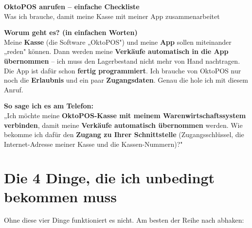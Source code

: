 \documentclass[11pt,a4paper]{article}
\newcommand{\hinweis}[1]{%
  \par\vspace{4pt}%
  \noindent\colorbox{hellgrau}{%
    \begin{minipage}{\dimexpr\linewidth-2\fboxsep}%
      \small #1%
    \end{minipage}}%
  \par\vspace{6pt}%
}
\newcommand{\sagen}[1]{%
  \par\vspace{3pt}%
  \noindent\colorbox{sagenblau}{%
    \begin{minipage}{\dimexpr\linewidth-2\fboxsep}%
      \small\textbf{\color{akzent}So sage ich es am Telefon:}\\[1pt] #1%
    \end{minipage}}%
  \par\vspace{5pt}%
}
\begin{document}
\begin{center}
  {\LARGE\bfseries\color{akzent} OktoPOS anrufen – einfache Checkliste}\\[5pt]
  {\large Was ich brauche, damit meine Kasse mit meiner App zusammenarbeitet}\\[8pt]
\end{center}

\hinweis{%
  \textbf{Worum geht es? (in einfachen Worten)}\\
  Meine \textbf{Kasse} (die Software „OktoPOS") und meine \textbf{App} sollen miteinander „reden"
  können. Dann werden meine \textbf{Verkäufe automatisch in die App übernommen} – ich muss den
  Lagerbestand nicht mehr von Hand nachtragen.\\[3pt]
  Die App ist dafür schon \textbf{fertig programmiert}. Ich brauche von OktoPOS nur noch die
  \textbf{Erlaubnis} und ein paar \textbf{Zugangsdaten}. Genau die hole ich mit diesem Anruf.%
}

\sagen{%
  „Ich möchte meine \textbf{OktoPOS-Kasse mit meinem Warenwirtschaftssystem verbinden}, damit meine
  \textbf{Verkäufe automatisch übernommen} werden. Wie bekomme ich dafür den \textbf{Zugang zu Ihrer
  Schnittstelle} (Zugangsschlüssel, die Internet-Adresse meiner Kasse und die Kassen-Nummern)?"%
}

\section{Die 4 Dinge, die ich unbedingt bekommen muss}
Ohne diese vier Dinge funktioniert es nicht. Am besten der Reihe nach abhaken:
\end{document}
